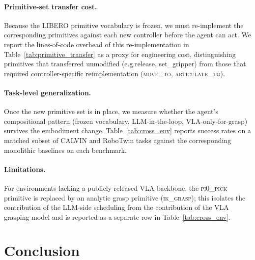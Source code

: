 \documentclass{article}
\begin{document}
	\paragraph{Primitive-set transfer cost.} Because the LIBERO
	primitive vocabulary is frozen, we must re-implement the
	corresponding primitives against each new controller before
	the agent can act. We report the lines-of-code overhead of this
	re-implementation in Table~\ref{tab:primitive_transfer} as a
	proxy for engineering cost, distinguishing primitives that
	transferred unmodified (e.g.\@ release, set\_gripper) from
	those that required controller-specific reimplementation
	(\textsc{move\_to}, \textsc{articulate\_to}).

	\paragraph{Task-level generalization.} Once the new primitive
	set is in place, we measure whether the agent's compositional
	pattern (frozen vocabulary, LLM-in-the-loop, VLA-only-for-grasp)
	survives the embodiment change. Table~\ref{tab:cross_env}
	reports success rates on a matched subset of CALVIN and
	RoboTwin tasks against the corresponding monolithic baselines
	on each benchmark.

	\paragraph{Limitations.} For environments lacking a publicly
	released VLA backbone, the \textsc{pi0\_pick} primitive is
	replaced by an analytic grasp primitive
	(\textsc{ik\_grasp}); this isolates the contribution of the
	LLM-side scheduling from the contribution of the VLA grasping
	model and is reported as a separate row in
	Table~\ref{tab:cross_env}.


\section{Conclusion}
\label{sec:conclusion}
\end{document}
